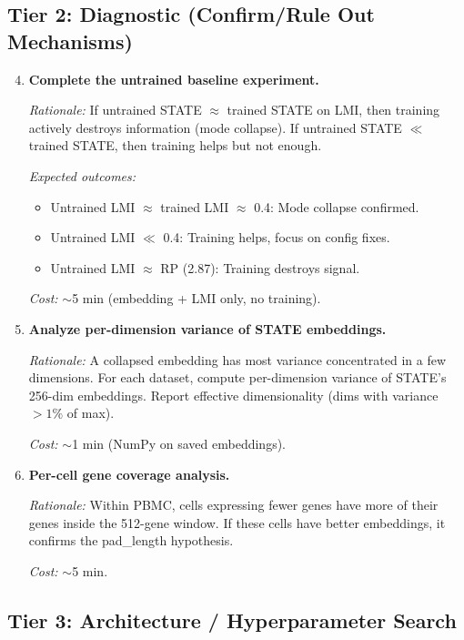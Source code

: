 \documentclass[11pt,a4paper]{article}
\begin{document}
\subsection{Tier 2: Diagnostic (Confirm/Rule Out Mechanisms)}

\begin{enumerate}
    \setcounter{enumi}{3}

    \item \textbf{Complete the untrained baseline experiment.}

    \textit{Rationale:} If untrained STATE $\approx$ trained STATE on LMI, then training actively destroys information (mode collapse). If untrained STATE $\ll$ trained STATE, then training helps but not enough.

    \textit{Expected outcomes:}
    \begin{itemize}
        \item Untrained LMI $\approx$ trained LMI $\approx$ 0.4: Mode collapse confirmed.
        \item Untrained LMI $\ll$ 0.4: Training helps, focus on config fixes.
        \item Untrained LMI $\approx$ RP (2.87): Training destroys signal.
    \end{itemize}

    \textit{Cost:} $\sim$5 min (embedding + LMI only, no training).

    \item \textbf{Analyze per-dimension variance of STATE embeddings.}

    \textit{Rationale:} A collapsed embedding has most variance concentrated in a few dimensions. For each dataset, compute per-dimension variance of STATE's 256-dim embeddings. Report effective dimensionality (dims with variance $> 1\%$ of max).

    \textit{Cost:} $\sim$1 min (NumPy on saved embeddings).

    \item \textbf{Per-cell gene coverage analysis.}

    \textit{Rationale:} Within PBMC, cells expressing fewer genes have more of their genes inside the 512-gene window. If these cells have better embeddings, it confirms the pad\_length hypothesis.

    \textit{Cost:} $\sim$5 min.
\end{enumerate}

\subsection{Tier 3: Architecture / Hyperparameter Search}
\end{document}
